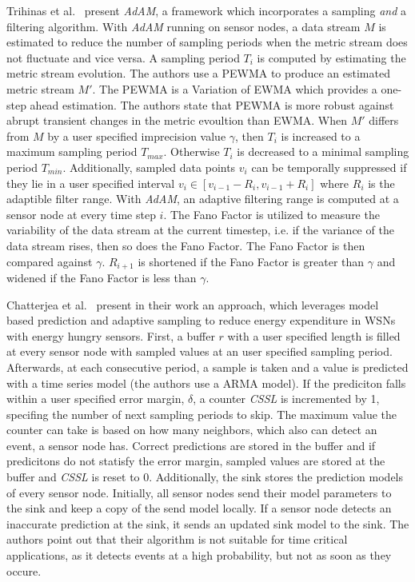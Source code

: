 Trihinas et al.~\cite{trihinas2015adam} present \textit{AdAM}, a framework
which incorporates a sampling \textit{and} a filtering algorithm. With
\textit{AdAM} running on sensor nodes, a data stream $ M $ is estimated to
reduce the number of sampling periods when the metric stream does not fluctuate
and vice versa. A sampling period $ T_i $ is computed by estimating the metric
stream evolution. The authors use a \ac{PEWMA} to produce an estimated metric
stream $ M' $. The \ac{PEWMA} is a Variation of \ac{EWMA} which provides a
one-step ahead estimation. The authors state that \ac{PEWMA} is more robust
against abrupt transient changes in the metric evoultion than \ac{EWMA}. When $
M' $ differs from $ M $ by a user specified imprecision value $
\gamma $, then $ T_i $ is increased to a maximum sampling period $ T_{max}
$. Otherwise $ T_i $ is decreased to a minimal sampling period $ T_{min} $.
Additionally, sampled data points $ v_{i} $ can be temporally suppressed if
they lie in a user specified interval $ v_i \in [v_{i-1} - R_i, v_{i-1} + R_i]
$ where $ R_i $ is the adaptible filter range. With \textit{AdAM}, an adaptive
filtering range is computed at a sensor node at every time step $ i $. The Fano
Factor is utilized to measure the variability of the data stream at the current
timestep, i.e. if the variance of the data stream rises, then so does the Fano
Factor. The Fano Factor is then compared against $ \gamma $. $ R_{i+1} $ is
shortened if the Fano Factor is greater than $ \gamma $ and widened if the Fano
Factor is less than $ \gamma $.

Chatterjea et al.~\cite{chatterjea2008adaptive} present in their work an
approach, which leverages model based prediction and adaptive sampling to
reduce energy expenditure in \acp{WSN} with energy hungry sensors. First, a
buffer $ r $ with a user specified length is filled at every sensor node with
sampled values at an user specified sampling period. Afterwards, at each
consecutive period, a sample is taken and a value is predicted with a time
series model (the authors use a \ac{ARMA} model). If the prediciton falls
within a user specified error margin, $ \delta $, a counter \textit{CSSL} is
incremented by 1, specifing the number of next sampling periods to skip. The
maximum value the counter can take is based on how many neighbors, which also
can detect an event, a sensor node has. Correct predictions are stored in the
buffer and if predicitons do not statisfy the error margin, sampled values are
stored at the buffer and \textit{CSSL} is reset to 0. Additionally, the sink
stores the prediction models of every sensor node. Initially, all sensor nodes
send their model parameters to the sink and keep a copy of the send model
locally. If a sensor node detects an inaccurate prediction at the sink, it
sends an updated sink model to the sink. The authors point out that their
algorithm is not suitable for time critical applications, as it detects events
at a high probability, but not as soon as they occure.

